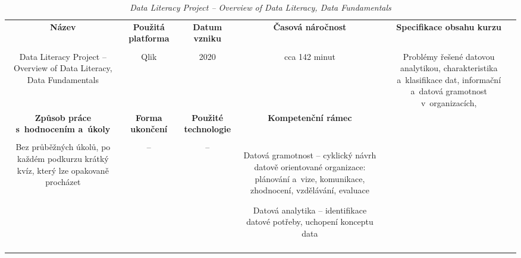 \begin{landscape}

\begin{table}[htbp]

\renewcommand\thetable{4}

\caption{\textit{Data Literacy Project – Overview of Data Literacy, Data Fundamentals}}\label{tab3}

\footnotesize

{

\justifying

\begin{tabularx}{\linewidth}{CCCCC}

\toprule

\textbf{Název} &

\textbf{Použitá platforma} &

\textbf{Datum vzniku} &

\textbf{Časová náročnost} &
 
\textbf{Specifikace obsahu kurzu}

\\

\tabularnewline
\midrule

Data Literacy Project – Overview of Data Literacy, Data Fundamentals

&

Qlik

&

2020

&

cca 142 minut

&

Problémy řešené datovou analytikou, charakteristika a~klasifikace dat, informační a~datová gramotnost v~organizacích, 

\\
\toprule

\textbf{Způsob práce s~hodnocením a~úkoly} &

\textbf{Forma ukončení} &

\textbf{Použité technologie} &

\textbf{Kompetenční rámec} 

\\

\tabularnewline
\midrule

Bez průběžných úkolů, po každém podkurzu krátký kvíz, který lze opakovaně procházet

&

–

&

–

&

Datová gramotnost – cyklický návrh datově orientované organizace: plánování a~vize, komunikace, zhodnocení, vzdělávání, evaluace

Datová analytika – identifikace datové potřeby, uchopení konceptu data

\\

\tabularnewline
\bottomrule
\end{tabularx}

}

\end{table}

\end{landscape}